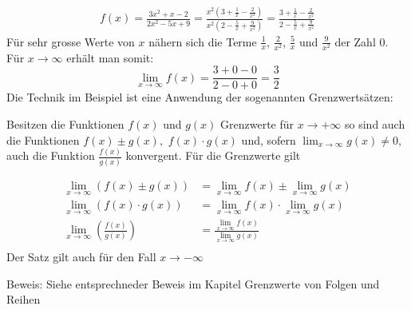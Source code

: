 \begin{align*}
    f(x) = \frac{3x^2+x-2}{2x^2-5x+9} = \frac{x^2\left(3+\frac{1}{x}-\frac{2}{x^2}\right)}{x^2\left(2-\frac{5}{x}+\frac{9}{x^2}\right)}=\frac{3+\frac{1}{x}-\frac{2}{x^2}}{2-\frac{5}{x}+\frac{9}{x^2}}
\end{align*}
Für sehr grosse Werte von $x$ nähern sich die Terme $\frac{1}{x}$, $\frac{2}{x^2}$, $\frac{5}{x}$ und $\frac{9}{x^2}$ der Zahl $0$. Für $x\to \infty$ erhält man somit:
\[
    \lim_{x\to \infty}f(x)=\frac{3+0-0}{2-0+0}=\frac{3}{2}
\]
Die Technik im Beispiel ist eine Anwendung der sogenannten Grenzwertsätzen:
\begin{theo}[Grenzwertsätze]{}{}
    Besitzen die Funktionen $f\left(x\right)$ und $g\left(x\right)$ Grenzwerte für $x\rightarrow+\infty$ so sind auch die Funktionen $f\left(x\right)\pm g\left(x\right),$ $f\left(x\right)\cdot g\left(x\right)$ und, sofern $\displaystyle\lim_{x\to \infty}g\left(x\right)\neq0$, auch die Funktion $\frac{f\left(x\right)}{g\left(x\right)}$ konvergent.
    Für die Grenzwerte gilt

    \begin{align*}
        \lim_{x \to \infty} (f(x) \pm  g(x))               & = \lim_{x\to\infty} f(x) \pm \lim_{x\to\infty} g(x)      \\
        \lim_{x \to \infty} (f(x) \cdot  g(x))             & = \lim_{x\to\infty} f(x) \cdot \lim_{x\to\infty} g(x)    \\
        \lim_{x \to \infty} \left(\frac{f(x)}{g(x)}\right) & = \frac{\lim_{x\to\infty} f(x)}{ \lim_{x\to\infty} g(x)} \\
    \end{align*}
    Der Satz gilt auch für den Fall $x \to -\infty$
\end{theo}
Beweis: Siehe entsprechneder Beweis im Kapitel \glqq Grenzwerte von Folgen und Reihen\grqq{}

